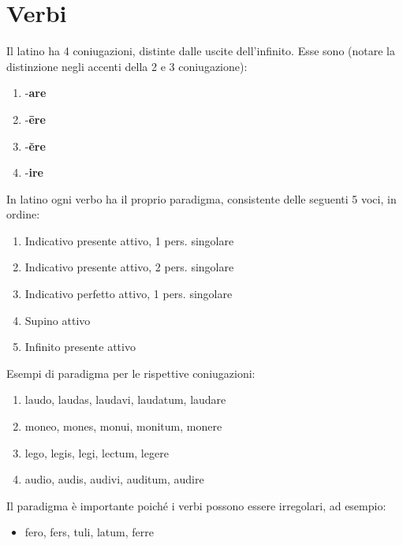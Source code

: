 \chapter{Verbi}
Il latino ha 4 coniugazioni, distinte dalle uscite dell'infinito. Esse sono (notare la distinzione
negli accenti della 2 e 3 coniugazione):

\begin{enumerate}
    \item -\textbf{are}
    \item -\textbf{\={e}re}
    \item -\textbf{\u{e}re}
    \item -\textbf{ire}
\end{enumerate}

In latino ogni verbo ha il proprio paradigma, consistente delle seguenti 5 voci, in ordine:

\begin{enumerate}
    \item Indicativo presente attivo, 1 pers. singolare
    \item Indicativo presente attivo, 2 pers. singolare
    \item Indicativo perfetto attivo, 1 pers. singolare
    \item Supino attivo
    \item Infinito presente attivo
\end{enumerate}

Esempi di paradigma per le rispettive coniugazioni:
\begin{enumerate}
    \item laudo, laudas, laudavi, laudatum, laudare
    \item moneo, mones, monui, monitum, monere
    \item lego, legis, legi, lectum, legere
    \item audio, audis, audivi, auditum, audire
\end{enumerate}

Il paradigma \`e importante poich\'e i verbi possono essere irregolari, ad esempio:

\begin{itemize}
    \item fero, fers, tuli, latum, ferre
\end{itemize}

\clearpage


